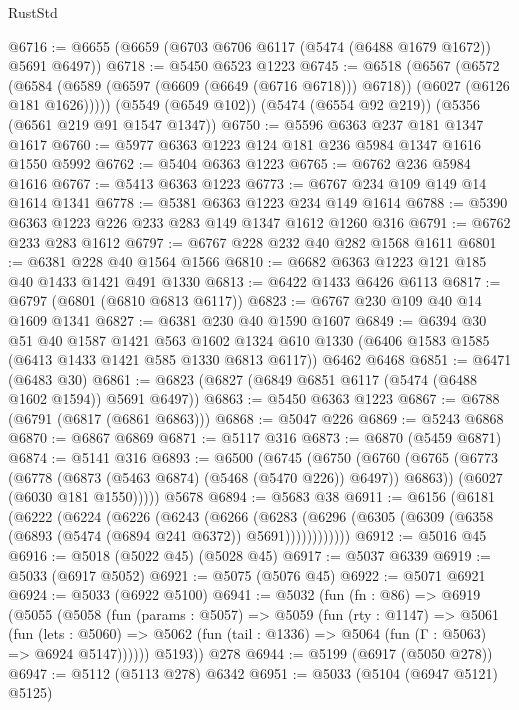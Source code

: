 \begin{lexlean}{RustStd}
\begin{coremodule}
@6716 := @6655 (@6659 (@6703 @6706 @6117 (@5474 (@6488 @1679 @1672)) @5691 @6497))
@6718 := @5450 @6523 @1223
@6745 := @6518
    (@6567
      (@6572
        (@6584 (@6589 (@6597 (@6609 (@6649 (@6716 @6718))) @6718)) (@6027 (@6126 @181 @1626)))))
    (@5549 (@6549 @102))
    (@5474 (@6554 @92 @219))
    (@5356 (@6561 @219 @91 @1547 @1347))
@6750 := @5596 @6363 @237 @181 @1347 @1617
@6760 := @5977 @6363 @1223 @124 @181 @236 @5984 @1347 @1616 @1550 @5992
@6762 := @5404 @6363 @1223
@6765 := @6762 @236 @5984 @1616
@6767 := @5413 @6363 @1223
@6773 := @6767 @234 @109 @149 @14 @1614 @1341
@6778 := @5381 @6363 @1223 @234 @149 @1614
@6788 := @5390 @6363 @1223 @226 @233 @283 @149 @1347 @1612 @1260 @316
@6791 := @6762 @233 @283 @1612
@6797 := @6767 @228 @232 @40 @282 @1568 @1611
@6801 := @6381 @228 @40 @1564 @1566
@6810 := @6682 @6363 @1223 @121 @185 @40 @1433 @1421 @491 @1330
@6813 := @6422 @1433 @6426 @6113
@6817 := @6797 (@6801 (@6810 @6813 @6117))
@6823 := @6767 @230 @109 @40 @14 @1609 @1341
@6827 := @6381 @230 @40 @1590 @1607
@6849 := @6394
    @30
    @51
    @40
    @1587
    @1421
    @563
    @1602
    @1324
    @610
    @1330
    (@6406 @1583 @1585 (@6413 @1433 @1421 @585 @1330 @6813 @6117))
    @6462
    @6468
@6851 := @6471 (@6483 @30)
@6861 := @6823 (@6827 (@6849 @6851 @6117 (@5474 (@6488 @1602 @1594)) @5691 @6497))
@6863 := @5450 @6363 @1223
@6867 := @6788 (@6791 (@6817 (@6861 @6863)))
@6868 := @5047 @226
@6869 := @5243 @6868
@6870 := @6867 @6869
@6871 := @5117 @316
@6873 := @6870 (@5459 @6871)
@6874 := @5141 @316
@6893 := @6500
    (@6745
      (@6750
        (@6760
          (@6765 (@6773 (@6778 (@6873 (@5463 @6874) (@5468 (@5470 @226)) @6497)) @6863))
          (@6027 (@6030 @181 @1550)))))
    @5678
@6894 := @5683 @38
@6911 := @6156
    (@6181
      (@6222
        (@6224
          (@6226
            (@6243
              (@6266
                (@6283
                  (@6296 (@6305 (@6309 (@6358 (@6893 (@5474 (@6894 @241 @6372)) @5691))))))))))))
@6912 := @5016 @45
@6916 := @5018 (@5022 @45) (@5028 @45)
@6917 := @5037 @6339
@6919 := @5033 (@6917 @5052)
@6921 := @5075 (@5076 @45)
@6922 := @5071 @6921
@6924 := @5033 (@6922 @5100)
@6941 := @5032
    (fun (fn : @86) =>
    @6919
      (@5055
        (@5058
          (fun (params : @5057) =>
          @5059
            (fun (rty : @1147) =>
            @5061
              (fun (lets : @5060) =>
              @5062 (fun (tail : @1336) => @5064 (fun (Γ : @5063) => @6924 @5147))))))
        @5193))
    @278
@6944 := @5199 (@6917 (@5050 @278))
@6947 := @5112 (@5113 @278) @6342
@6951 := @5033 (@5104 (@6947 @5121) @5125)

\end{coremodule}
\end{lexlean}
